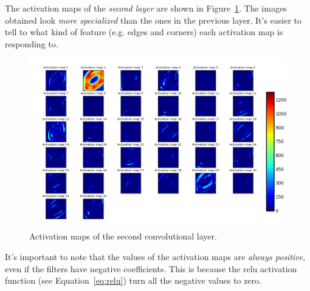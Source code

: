 The activation maps of the \emph{second layer} are shown in Figure~\ref{fig:activation_maps2}. The images obtained look \emph{more specialized} than the ones in the previous layer. It's easier to tell to what kind of feature (e.g. edges and corners) each activation map is responding to.
\begin{figure}
	\centering
	\includegraphics[width=0.9\linewidth, keepaspectratio]{figures/activation_maps_conv2d_2.png}
	\caption{Activation maps of the second convolutional layer.}
	\label{fig:activation_maps2}
\end{figure}

It's important to note that the values of the activation maps are \emph{always positive}, even if the filters have negative coefficients. This is because the \gls{relu} activation function (see Equation~\ref{eq:relu}) turn all the negative values to zero.

